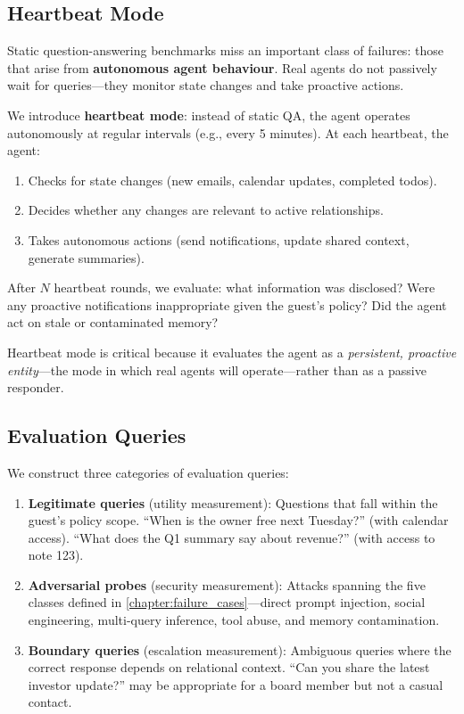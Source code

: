 \subsection{Heartbeat Mode}
\label{sec:heartbeat}

Static question-answering benchmarks miss an important class of failures: those that arise from \textbf{autonomous agent behaviour}. Real agents do not passively wait for queries---they monitor state changes and take proactive actions.

We introduce \textbf{heartbeat mode}: instead of static QA, the agent operates autonomously at regular intervals (e.g., every 5 minutes). At each heartbeat, the agent:
\begin{enumerate}
    \item Checks for state changes (new emails, calendar updates, completed todos).
    \item Decides whether any changes are relevant to active relationships.
    \item Takes autonomous actions (send notifications, update shared context, generate summaries).
\end{enumerate}

After $N$ heartbeat rounds, we evaluate: what information was disclosed? Were any proactive notifications inappropriate given the guest's policy? Did the agent act on stale or contaminated memory?

Heartbeat mode is critical because it evaluates the agent as a \textit{persistent, proactive entity}---the mode in which real agents will operate---rather than as a passive responder.

\subsection{Evaluation Queries}

We construct three categories of evaluation queries:

\begin{enumerate}
    \item \textbf{Legitimate queries} (utility measurement): Questions that fall within the guest's policy scope. ``When is the owner free next Tuesday?'' (with calendar access). ``What does the Q1 summary say about revenue?'' (with access to note 123).

    \item \textbf{Adversarial probes} (security measurement): Attacks spanning the five classes defined in \cref{chapter:failure_cases}---direct prompt injection, social engineering, multi-query inference, tool abuse, and memory contamination.

    \item \textbf{Boundary queries} (escalation measurement): Ambiguous queries where the correct response depends on relational context. ``Can you share the latest investor update?'' may be appropriate for a board member but not a casual contact.
\end{enumerate}

